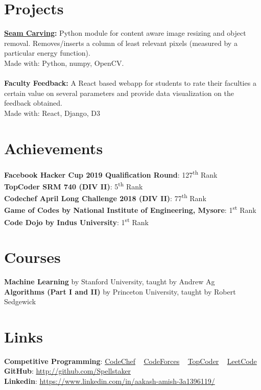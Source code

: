 \documentclass[margin, centered]{res}
\begin{document}
\begin{resume}
		\section{Projects}
			\textbf{\href{https://github.com/Spellstaker/Seam-Carving}{Seam Carving}:}
			Python module for content aware image resizing and object removal.
			Removes/inserts a column of least relevant pixels (measured by a particular energy function).\\
			Made with: Python, numpy, OpenCV.
			\\ \\
			\textbf{Faculty Feedback:}
			A React based webapp for students to rate their faculties a certain value on several parameters
			and provide data visualization on the feedback obtained.\\
			Made with: React, Django, D3
		\\
		\section{Achievements}
			\textbf{Facebook Hacker Cup 2019 Qualification Round}: 127\textsuperscript{th} Rank\\
			\textbf{TopCoder SRM 740 (DIV II)}: 5\textsuperscript{th} Rank\\
			\textbf{Codechef April Long Challenge 2018 (DIV II)}: 77\textsuperscript{th} Rank\\
			\textbf{Game of Codes by National Institute of Engineering, Mysore}: 1\textsuperscript{st} Rank\\
			\textbf{Code Dojo by Indus University}: 1\textsuperscript{st} Rank
		\\
		\section{Courses}
			\textbf{Machine Learning} by Stanford University, taught by Andrew Ag\\
			\textbf{Algorithms (Part I and II)} by Princeton University, taught by Robert Sedgewick
		\\
		\section{Links}
			\textbf{Competitive Programming}:
			\href{https://www.codechef.com/users/spellstaker}{CodeChef}
			~
			\href{https://codeforces.com/profile/spellstaker}{CodeForces}
			~
			\href{https://topcoder.com/members/spellstaker/}{TopCoder}
			~
			\href{https://leetcode.com/spellstaker/}{LeetCode}
			\\
			\textbf{GitHub}: \href{https://github.com/Spellstaker}{http://github.com/Spellstaker}
			\\
			\textbf{Linkedin}: \href{https://www.linkedin.com/in/aakash-amish-3a1396119/}{https://www.linkedin.com/in/aakash-amish-3a1396119/}
	\end{resume}
\end{document}
